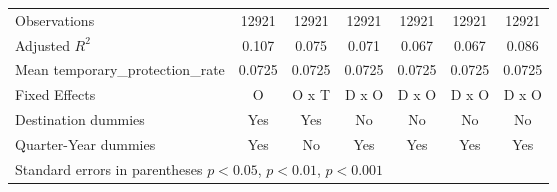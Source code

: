 \begin{table}[!ht]
\begin{tabular}{l*{6}{c}}
\hline
Observations        &       12921         &       12921         &       12921         &       12921         &       12921         &       12921         \\
Adjusted \(R^{2}\)  &       0.107         &       0.075         &       0.071         &       0.067         &       0.067         &       0.086         \\
Mean temporary\_protection\_rate&      0.0725         &      0.0725         &      0.0725         &      0.0725         &      0.0725         &      0.0725         \\
Fixed Effects       &           O         &       O x T         &       D x O         &       D x O         &       D x O         &       D x O         \\
Destination dummies &         Yes         &         Yes         &          No         &          No         &          No         &          No         \\
Quarter-Year dummies&         Yes         &          No         &         Yes         &         Yes         &         Yes         &         Yes         \\
\hline\hline
\multicolumn{7}{l}{ Standard errors in parentheses \sym{*} \(p<0.05\), \sym{**} \(p<0.01\), \sym{***} \(p<0.001\)}\\
\end{tabular}
\end{table}
